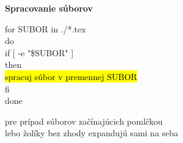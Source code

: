 \documentclass[8pt,landscape]{extarticle}
\newcommand{\Heading}[1]{%
{\begin{center}\bfseries\Large#1\end{center}}%
}%
\newcommand{\Em}[1]{\Ovalbox{#1}}
\newenvironment{karticka}[1]%
{%
\Heading{#1}%
}%
{%
\clearpage
}%
\begin{document}
\begin{karticka}{Spracovanie súborov}
\begin{tcolorbox}[sharp corners, grow to left by=3mm, leftrule=0mm, rightrule=0mm, grow to right by=3mm,top=0mm,bottom=0mm]
for SUBOR in ./*.tex\\
do\\
\phantom{XX}if [ -e "\$SUBOR" ]\\
\phantom{XX}then\\
\phantom{XXXX}\hl{spracuj súbor v premennej SUBOR}\\
\phantom{XX}fi\\
done
\end{tcolorbox}
\Em{./*} pre prípad súborov začínajúcich pomlčkou \\
\Em{-e} lebo žolíky bez zhody expandujú sami na seba
\end{karticka}
\end{document}
